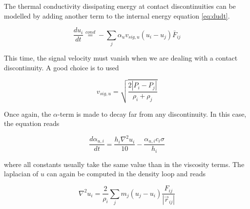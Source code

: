 \documentclass[a4paper,10pt]{article}
\begin{document}
The thermal conductivity dissipating energy at contact discontinuities can be modelled by adding another term to the
internal energy equation \ref{eq:dudt}. 

\begin{equation}
 \frac{du_i}{dt} \stackrel{cond}{=} - \sum_j \alpha_u v_{sig,u}\left(u_i - u_j\right)\bar{F}_{ij}
\end{equation}

This time, the signal velocity must vanish when we are dealing with a contact discontinuity. A good choice is to used

\begin{equation}
 v_{sig,u} = \sqrt{\frac{2|P_i-P_j|}{\rho_i+\rho_j}}
\end{equation}

Once again, the $\alpha$-term is made to decay far from any discontinuity. In this case, the equation reads

\begin{equation}
 \frac{d\alpha_{u,i}}{dt} = \frac{h_i \nabla^2 u_i}{10} - \frac{\alpha_{u,i}c_i\sigma}{h_i} 
\end{equation}

where all constants usually take the same value than in the viscosity terms. The laplacian of $u$ can again be computed
in the density loop and reads

\begin{equation}
 \nabla^2 u_i = \frac{2}{\rho_i} \sum_j m_j \left(u_j - u_i\right) \frac{F_{ij}}{|\vec{r}_{ij}|}
\end{equation}
\end{document}
